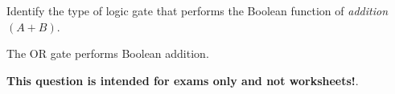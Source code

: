 

Identify the type of logic gate that performs the Boolean function of {\it addition} $(A + B)$.







The OR gate performs Boolean addition.







{\bf This question is intended for exams only and not worksheets!}.




